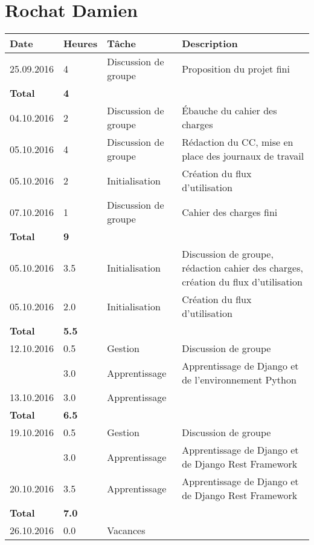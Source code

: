 \documentclass[french]{article}
\begin{document}
	\section*{Rochat Damien}
	\begin{longtable}{p{}|p{}|p{}|p{}}
		Date & Heures & Tâche & Description \\
		\hline

		\hline
		25.09.2016 & 4 & Discussion de groupe & Proposition du projet fini\\
		\textbf{Total} & \textbf{4} &&\\
		\hline
		04.10.2016 & 2 & Discussion de groupe & Ébauche du cahier des charges\\
		05.10.2016 & 4 & Discussion de groupe & Rédaction du CC, mise en place des journaux de travail\\
		05.10.2016 & 2 & Initialisation & Création du flux d'utilisation \\
		07.10.2016 & 1 & Discussion de groupe & Cahier des charges fini\\
		\textbf{Total} & \textbf{9} &&\\
		\hline

		\hline
		05.10.2016 & 3.5 & Initialisation & Discussion de groupe, rédaction cahier des charges, création du flux d'utilisation \\
		05.10.2016 & 2.0 & Initialisation & Création du flux d'utilisation \\
		\textbf{Total} & \textbf{5.5} && \\

		\hline
		12.10.2016 & 0.5 & Gestion & Discussion de groupe \\
			       & 3.0 & Apprentissage & Apprentissage de Django et de l'environnement Python \\
		13.10.2016 & 3.0 & \multicolumn{2}{l}{Apprentissage} \\
		\textbf{Total} & \textbf{6.5} && \\

		\hline
		19.10.2016 & 0.5 & Gestion & Discussion de groupe \\
				   & 3.0 & Apprentissage & Apprentissage de Django et de Django Rest Framework \\
	    20.10.2016 & 3.5 & Apprentissage & Apprentissage de Django et de Django Rest Framework \\
		\textbf{Total} & \textbf{7.0} && \\

		\hline
		26.10.2016 & 0.0 & \multicolumn{2}{l}{Vacances} \\


\end{longtable}
\end{document}
